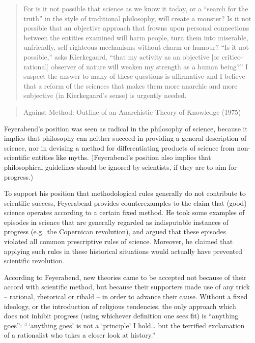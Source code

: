 \documentclass[
]{article}
\begin{document}
\begin{quote}
For is it not possible that science as we know it today, or a ``search
for the truth'' in the style of traditional philosophy, will create a
monster? Is it not possible that an objective approach that frowns upon
personal connections between the entities examined will harm people,
turn them into miserable, unfriendly, self-righteous mechanisms without
charm or humour? ``Is it not possible,'' asks Kierkegaard, ``that my
activity as an objective {[}or critico-rational{]} observer of nature
will weaken my strength as a human being?'' I suspect the answer to many
of these questions is affirmative and I believe that a reform of the
sciences that makes them more anarchic and more subjective (in
Kierkegaard's sense) is urgently needed.
\end{quote}

\begin{quote}
Against Method: Outline of an Anarchistic Theory of Knowledge (1975)
\end{quote}

Feyerabend's position was seen as radical in the philosophy of science,
because it implies that philosophy can neither succeed in providing a
general description of science, nor in devising a method for
differentiating products of science from non-scientific entities like
myths. (Feyerabend's position also implies that philosophical guidelines
should be ignored by scientists, if they are to aim for progress.)

To support his position that methodological rules generally do not
contribute to scientific success, Feyerabend provides counterexamples to
the claim that (good) science operates according to a certain fixed
method. He took some examples of episodes in science that are generally
regarded as indisputable instances of progress (e.g.~the Copernican
revolution), and argued that these episodes violated all common
prescriptive rules of science. Moreover, he claimed that applying such
rules in these historical situations would actually have prevented
scientific revolution.

According to Feyerabend, new theories came to be accepted not because of
their accord with scientific method, but because their supporters made
use of any trick -- rational, rhetorical or ribald -- in order to
advance their cause. Without a fixed ideology, or the introduction of
religious tendencies, the only approach which does not inhibit progress
(using whichever definition one sees fit) is ``anything goes'':
``\,`anything goes' is not a `principle' I hold\ldots{} but the
terrified exclamation of a rationalist who takes a closer look at
history.''
\end{document}
